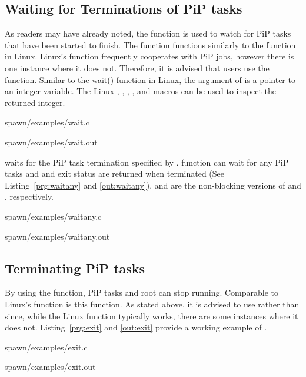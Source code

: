 \subsection{Waiting for Terminations of PiP tasks}

As readers may have already noted, the  function
is used to watch for PiP tasks that have been started to finish. The
 function functions similarly to the
 function in Linux. Linux's 
 function frequently cooperates with PiP jobs,
however there is one instance where it does not. Therefore, it is
advised that users use the  function.  Similar to
the wait() function in Linux, the argument of  is
a pointer to an integer variable. The Linux ,
, ,
, and  macros can be
used to inspect the returned integer.


                {spawn/examples/wait.c}

 {spawn/examples/wait.out}

 waits for the PiP task termination specified by
        {\PIPID}. 
 function can wait for any PiP tasks and
        {\PIPID} and exit status are returned when terminated (See
        Listing~\ref{prg:waitany} and \ref{out:waitany}).
         and  are
        the non-blocking versions of  and
        , respectively. 


                {spawn/examples/waitany.c}

 {spawn/examples/waitany.out}


\subsection{Terminating PiP tasks}

By using the  function, PiP tasks and root can stop
running. Comparable to Linux's  function is this function. As
stated above, it is advised to use  rather than
 since, while the Linux  function
typically works, there are some instances where it does
not. Listing~\ref{prg:exit} and \ref{out:exit} provide a working 
example of .

 {spawn/examples/exit.c}

 {spawn/examples/exit.out}
